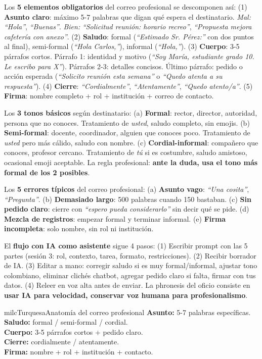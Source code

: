 \documentclass[11pt,letterpaper]{article}
\newcommand{\milcpaso}[3]{%
\Needspace{4\baselineskip}%
\begin{tcolorbox}[enhanced,colback=white,colframe=milcLinea,arc=1.5mm,boxrule=.9pt,
  left=14mm,right=4mm,top=3mm,bottom=3mm,before skip=4pt,after skip=4pt,
  fontupper=\RaggedRight,
  overlay={\node[anchor=north west,circle,fill=#2,text=white,inner sep=0pt,
    minimum size=7.4mm,font=\sffamily\bfseries\small]
    at ([xshift=3.6mm,yshift=-3.2mm]frame.north west) {#1};}]
#3
\end{tcolorbox}}
\begin{document}
\milcpaso{1}{milcTurquesa}{Los \textbf{5 elementos obligatorios} del correo profesional se descomponen así: (1) \textbf{Asunto claro}: máximo 5-7 palabras que digan qué espera el destinatario. \emph{Mal:} \emph{``Hola''}, \emph{``Buenas''}. \emph{Bien:} \emph{``Solicitud reunión: horario recreo''}, \emph{``Propuesta mejora cafetería con anexo''}. (2) \textbf{Saludo}: formal (\emph{``Estimado Sr. Pérez:''} con dos puntos al final), semi-formal (\emph{``Hola Carlos,''}), informal (\emph{``Hola,''}). (3) \textbf{Cuerpo}: 3-5 párrafos cortos. Párrafo 1: identidad y motivo (\emph{``Soy María, estudiante grado 10. Le escribo para X''}). Párrafos 2-3: detalles concisos. Último párrafo: pedido o acción esperada (\emph{``Solicito reunión esta semana''} o \emph{``Quedo atenta a su respuesta''}). (4) \textbf{Cierre}: \emph{``Cordialmente''}, \emph{``Atentamente''}, \emph{``Quedo atento/a''}. (5) \textbf{Firma}: nombre completo + rol + institución + correo de contacto.}
\milcpaso{2}{milcTurquesa}{Los \textbf{3 tonos básicos} según destinatario: (a) \textbf{Formal}: rector, director, autoridad, persona que no conoces. Tratamiento de \emph{usted}, saludo completo, sin emojis. (b) \textbf{Semi-formal}: docente, coordinador, alguien que conoces poco. Tratamiento de \emph{usted} pero más cálido, saludo con nombre. (c) \textbf{Cordial-informal}: compañero que conoces, profesor cercano. Tratamiento de \emph{tú} si es costumbre, saludo amistoso, ocasional emoji aceptable. La regla profesional: \textbf{ante la duda, usa el tono más formal de los 2 posibles}.}
\milcpaso{3}{milcTurquesa}{Los \textbf{5 errores típicos} del correo profesional: (a) \textbf{Asunto vago}: \emph{``Una cosita''}, \emph{``Pregunta''}. (b) \textbf{Demasiado largo}: 500 palabras cuando 150 bastaban. (c) \textbf{Sin pedido claro}: cierre con \emph{``espero pueda considerarlo''} sin decir qué se pide. (d) \textbf{Mezcla de registros}: empezar formal y terminar informal. (e) \textbf{Firma incompleta}: solo nombre, sin rol ni institución.}
\milcpaso{4}{milcTurquesa}{El \textbf{flujo con IA como asistente} sigue 4 pasos: (1) Escribir prompt con las 5 partes (sesión 3: rol, contexto, tarea, formato, restricciones). (2) Recibir borrador de IA. (3) Editar a mano: corregir saludo si es muy formal/informal, ajustar tono colombiano, eliminar clichés chatbot, agregar pedido claro si falta, firmar con tus datos. (4) Releer en voz alta antes de enviar. La phronesis del oficio consiste en \textbf{usar IA para velocidad, conservar voz humana para profesionalismo}.}

\begin{drawbox}{milcTurquesa}{Anatomía del correo profesional}
\textbf{Asunto:} 5-7 palabras específicas. \\[1mm] \textbf{Saludo:} formal / semi-formal / cordial. \\[1mm] \textbf{Cuerpo:} 3-5 párrafos cortos + pedido claro. \\[1mm] \textbf{Cierre:} cordialmente / atentamente. \\[1mm] \textbf{Firma:} nombre + rol + institución + contacto.
\end{drawbox}
\end{document}

